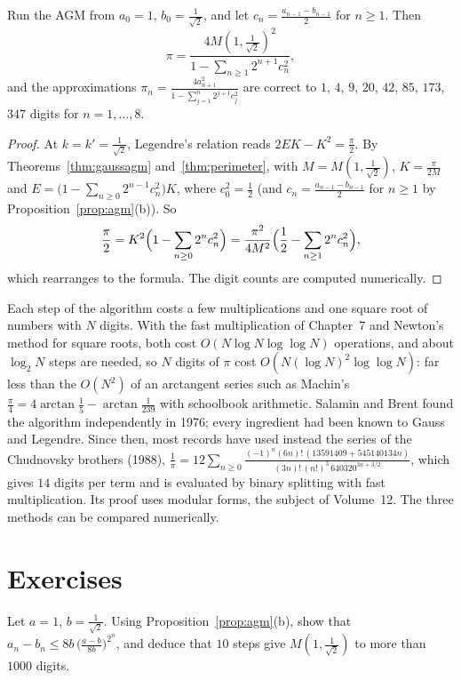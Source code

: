 \begin{theorem}\label{thm:brentsalamin}
Run the AGM from $a_0=1$, $b_0=\frac1{\sqrt2}$, and let $c_n=\frac{a_{n-1}-b_{n-1}}2$ for $n\ge1$. Then
\[
\pi=\frac{4M(1,\frac1{\sqrt2})^2}{1-\sum_{n\ge1}2^{n+1}c_n^2},
\]
and the approximations $\pi_n=\frac{4a_{n+1}^2}{1-\sum_{j=1}^{n}2^{j+1}c_j^2}$ are correct to $1$, $4$, $9$, $20$, $42$, $85$, $173$, $347$ digits for $n=1,\dots,8$.
\end{theorem}
\begin{proof}
At $k=k'=\frac1{\sqrt2}$, Legendre's relation reads $2EK-K^2=\frac\pi2$. By Theorems~\ref{thm:gaussagm} and~\ref{thm:perimeter}, with $M=M(1,\frac1{\sqrt2})$, $K=\frac\pi{2M}$ and
$E=\bigl(1-\sum_{n\ge0}2^{n-1}c_n^2\bigr)K$, where $c_0^2=\frac12$ (and $c_n=\frac{a_{n-1}-b_{n-1}}2$ for $n\ge1$ by Proposition~\ref{prop:agm}(b)). So
\[
\frac\pi2=K^2\Bigl(1-\sum_{n\ge0}2^nc_n^2\Bigr)=\frac{\pi^2}{4M^2}\Bigl(\frac12-\sum_{n\ge1}2^nc_n^2\Bigr),
\]
which rearranges to the formula. The digit counts are computed numerically.
\end{proof}

\begin{remark}
Each step of the algorithm costs a few multiplications and one square root of numbers with $N$ digits. With the fast multiplication of Chapter~7 and
Newton's method for square roots, both cost $O(N\log N\log\log N)$ operations, and about $\log_2N$ steps are needed, so $N$ digits of $\pi$ cost
$O(N(\log N)^2\log\log N)$: far less than the $O(N^2)$ of an arctangent series such as Machin's $\frac\pi4=4\arctan\frac15-\arctan\frac1{239}$ with schoolbook arithmetic. Salamin and Brent
found the algorithm independently in 1976; every ingredient had been known to Gauss and Legendre. Since then, most records have used instead the series
of the Chudnovsky brothers (1988), $\frac1\pi=12\sum_{n\ge0}\frac{(-1)^n(6n)!\,(13591409+545140134n)}{(3n)!\,(n!)^3\,640320^{3n+3/2}}$, which gives $14$ digits per term and is
evaluated by binary splitting with fast multiplication. Its proof uses modular forms, the subject of Volume~12. The three methods can be compared numerically.
\end{remark}

\section{Exercises}

\begin{exercise}[$\star$]\label{ex:agmsteps}
Let $a=1$, $b=\frac1{\sqrt2}$. Using Proposition~\ref{prop:agm}(b), show that $a_n-b_n\le8b\,\bigl(\frac{a-b}{8b}\bigr)^{2^n}$, and deduce that $10$ steps give $M(1,\frac1{\sqrt2})$ to
more than $1000$ digits.
\end{exercise}

